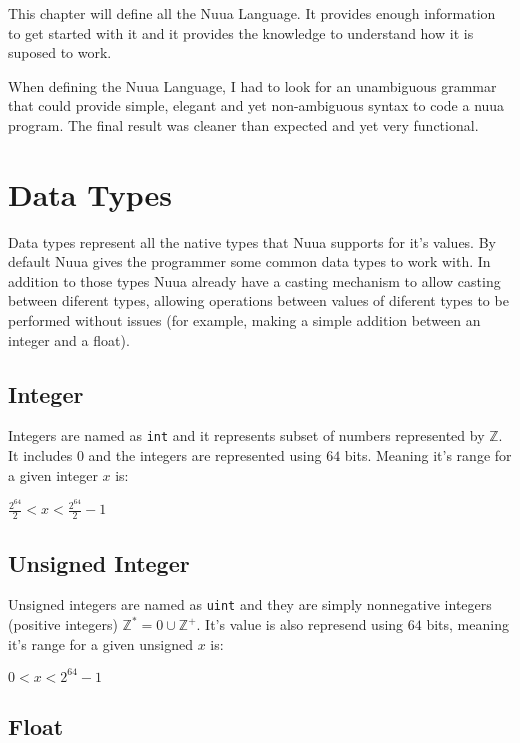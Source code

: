 This chapter will define all the Nuua Language. It provides enough information to get started with it
and it provides the knowledge to understand how it is suposed to work.

When defining the Nuua Language, I had to look for an unambiguous grammar that could provide simple, elegant
and yet non-ambiguous syntax to code a nuua program. The final result was cleaner than expected and yet very
functional.

\section{Data Types}

Data types represent all the native types that Nuua supports for it's values. By default Nuua
gives the programmer some common data types to work with. In addition to those types
Nuua already have a casting mechanism to allow casting between diferent types, allowing
operations between values of diferent types to be performed without issues (for example, making a simple
addition between an integer and a float).

\subsection{Integer}

Integers are named as \texttt{int} and it represents subset of numbers represented by $\mathbb{Z}$. It includes 0
and the integers are represented using $64$ bits. Meaning it's range for a given integer $x$ is:

\begin{center}
$\frac{2^{64}}{2} < x < \frac{2^{64}}{2} - 1$
\end{center}

\subsection{Unsigned Integer}

Unsigned integers are named as \texttt{uint} and they are simply nonnegative integers (positive integers) $\mathbb{Z}^*={0} \cup \mathbb{Z}^+$.
It's value is also represend using $64$ bits, meaning it's range for a given unsigned $x$ is:

\begin{center}
    $0 < x < 2^{64} - 1$
\end{center}

\subsection{Float}

